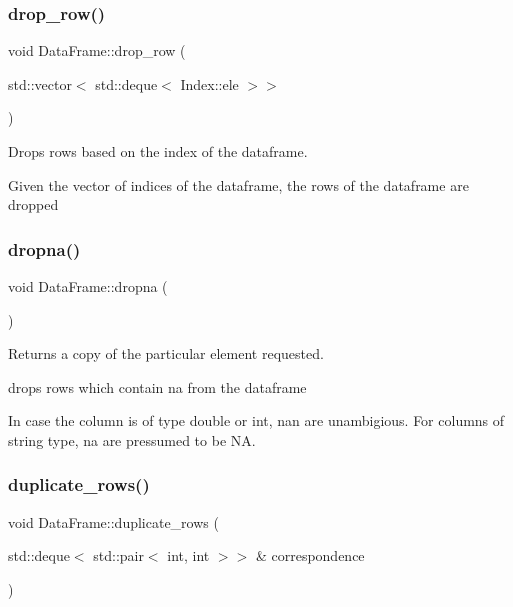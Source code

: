 \subsubsection{\texorpdfstring{drop\+\_\+row()}{drop\_row()}}
{\footnotesize\ttfamily void Data\+Frame\+::drop\+\_\+row (\begin{DoxyParamCaption}\item[{std\+::vector$<$ std\+::deque$<$ Index\+::ele $>$$>$}]{ }\end{DoxyParamCaption})}



Drops rows based on the index of the dataframe. 

Given the vector of indices of the dataframe, the rows of the dataframe are dropped \mbox{\label{classDataFrame_a6abc672ac4c439e3e785bd3f84c8da15}} 
\subsubsection{\texorpdfstring{dropna()}{dropna()}}
{\footnotesize\ttfamily void Data\+Frame\+::dropna (\begin{DoxyParamCaption}{ }\end{DoxyParamCaption})}



Returns a copy of the particular element requested. 

drops rows which contain na from the dataframe

In case the column is of type double or int, nan are unambigious. For columns of string type, na are pressumed to be \textquotesingle{}NA\textquotesingle{}. \mbox{\label{classDataFrame_a6c62eeccda5f10832a286906482263f7}} 
\subsubsection{\texorpdfstring{duplicate\+\_\+rows()}{duplicate\_rows()}\hspace{0.1cm}{\footnotesize\ttfamily [1/2]}}
{\footnotesize\ttfamily void Data\+Frame\+::duplicate\+\_\+rows (\begin{DoxyParamCaption}\item[{std\+::deque$<$ std\+::pair$<$ int, int $>$$>$ \&}]{correspondence }\end{DoxyParamCaption})\hspace{0.3cm}{\ttfamily [private]}}



